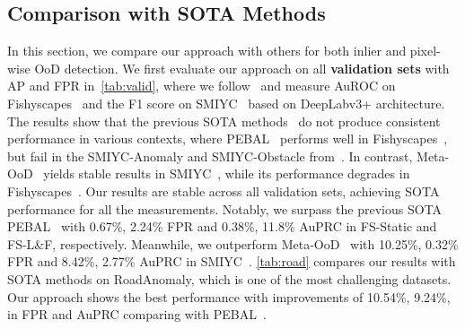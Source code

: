 \documentclass[10pt,twocolumn,letterpaper]{article}
\begin{document}
\subsection{Comparison with SOTA Methods}
In this section, we compare our approach with others for both inlier and pixel-wise OoD detection. 
We first evaluate our approach on all  \textbf{validation sets} with AP and FPR in~\cref{tab:valid}, where we follow~\cite{tian2021pixel} and measure AuROC on Fishyscapes~\cite{blum2021fishyscapes} and the F1 score on SMIYC~\cite{chan2021segmentmeifyoucan} based on DeepLabv3+ architecture. 
The results show that the previous SOTA methods~\cite{chan2021entropy,tian2021pixel,grcic2022densehybrid} do not produce consistent performance in various contexts, where 
PEBAL~\cite{tian2021pixel} performs well in Fishyscapes~\cite{blum2021fishyscapes}, but fail in the SMIYC-Anomaly and SMIYC-Obstacle from~\cite{chan2021segmentmeifyoucan}. In contrast, Meta-OoD~\cite{chan2021entropy} yields stable results in SMIYC~\cite{chan2021segmentmeifyoucan}, while its performance degrades in Fishyscapes~\cite{blum2021fishyscapes}. 
Our results are stable across all validation sets, achieving SOTA performance for all the measurements. 
Notably, we surpass the previous SOTA PEBAL~\cite{tian2021pixel} with 0.67\%, 2.24\% FPR and 0.38\%, 11.8\% AuPRC in FS-Static and FS-L\&F, respectively. Meanwhile, we outperform Meta-OoD~\cite{chan2021entropy} with 10.25\%, 0.32\% FPR and 8.42\%, 2.77\% AuPRC in SMIYC~\cite{chan2021segmentmeifyoucan}. \cref{tab:road} compares our results with SOTA methods on RoadAnomaly, which is one of the most challenging datasets. Our approach shows the best performance with improvements of 10.54\%, 9.24\%, in FPR and AuPRC comparing with PEBAL~\cite{tian2021pixel}. 
\end{document}
